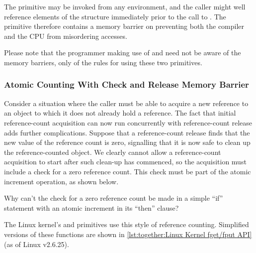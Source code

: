 \begin{lineref}
The  primitive may be invoked from any environment,
and the caller might well reference elements of the 
structure immediately prior to the call to .
The  primitive therefore contains a memory
barrier on  preventing both the compiler and the CPU
from misordering accesses.
\end{lineref}

Please note that the programmer making use of  and
 need not be aware of the memory barriers, only
of the rules for using these two primitives.

\subsubsection{Atomic Counting With Check and Release Memory Barrier}
\label{sec:together:Atomic Counting With Check and Release Memory Barrier}

Consider a situation where the caller must be able to acquire a new
reference to an object to which it does not already hold a reference.
The fact that initial reference-count acquisition can now run concurrently
with reference-count release adds further complications.
Suppose that a reference-count release finds that the new
value of the reference count is zero, signalling that it is
now safe to clean up the reference-counted object.
We clearly cannot allow a reference-count acquisition to
start after such clean-up has commenced, so the acquisition
must include a check for a zero reference count.
This check must be part of the atomic increment operation,
as shown below.

\QuickQuiz{}
	Why can't the check for a zero reference count be
	made in a simple ``if'' statement with an atomic
	increment in its ``then'' clause?
 \QuickQuizEnd

The Linux kernel's  and  primitives
use this style of reference counting.
Simplified versions of these functions are shown in
\cref{lst:together:Linux Kernel fget/fput API} (as of Linux v2.6.25).

